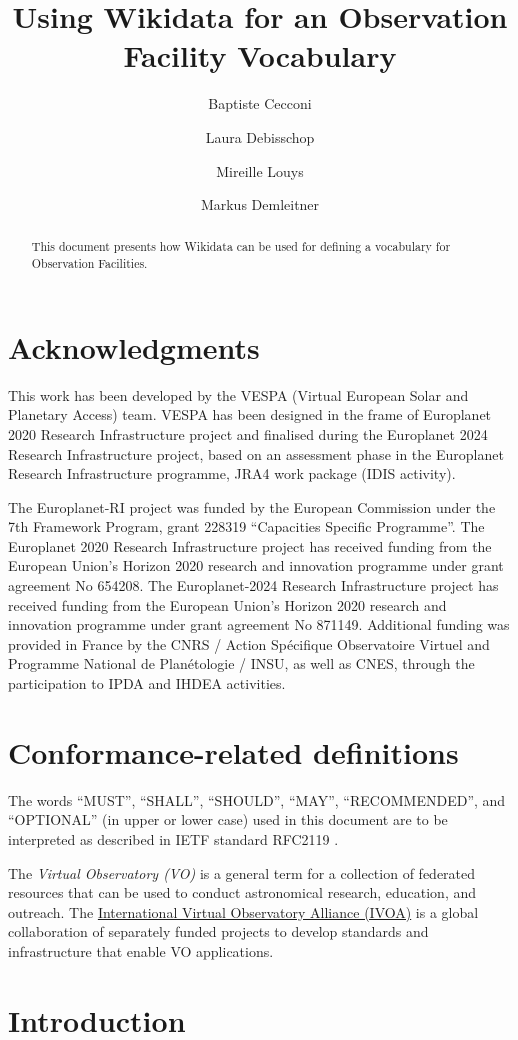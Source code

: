 \documentclass[11pt,a4paper]{ivoa}
\title{Using Wikidata for an Observation Facility Vocabulary}
\author[mailto:baptiste.cecconi@obspm.fr]{Baptiste Cecconi}
\author{Laura Debisschop}
\author{Mireille Louys}
\author{Markus Demleitner}
\begin{document}
\begin{abstract}
This document presents how Wikidata can be used for defining a 
vocabulary for Observation Facilities. 
\end{abstract}


\section*{Acknowledgments}

This work has been developed by the VESPA (Virtual European Solar
and Planetary Access) team.  VESPA has been designed in the frame of
Europlanet 2020 Research Infrastructure project and finalised
during the Europlanet 2024 Research Infrastructure project,
based on an assessment phase in the Europlanet Research Infrastructure
 programme, JRA4 work package (IDIS activity).

The Europlanet-RI project was funded by the European Commission under the
7th Framework Program, grant 228319 ``Capacities Specific Programme''.
The Europlanet 2020 Research Infrastructure project has
received funding from the European Union's Horizon 2020 research and
innovation programme under grant agreement No 654208.  The Europlanet-2024
Research Infrastructure project has received funding from
the European Union's Horizon 2020 research and innovation programme under
grant agreement No 871149.  Additional funding was provided in France by
the CNRS / Action Sp\'ecifique Observatoire Virtuel and Programme National
de Plan\'etologie / INSU, as well as CNES, through the participation to
IPDA and IHDEA activities.

\section*{Conformance-related definitions}

The words ``MUST'', ``SHALL'', ``SHOULD'', ``MAY'', ``RECOMMENDED'', and
``OPTIONAL'' (in upper or lower case) used in this document are to be
interpreted as described in IETF standard RFC2119 \citep{std:RFC2119}.

The \emph{Virtual Observatory (VO)} is a
general term for a collection of federated resources that can be used
to conduct astronomical research, education, and outreach.
The \href{https://www.ivoa.net}{International
Virtual Observatory Alliance (IVOA)} is a global
collaboration of separately funded projects to develop standards and
infrastructure that enable VO applications.


\section{Introduction}
\end{document}
